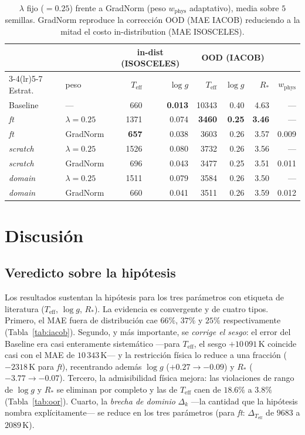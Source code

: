 \documentclass[sigconf,ACM]{acmart}
\begin{document}
\begin{table}[htbp]
  \caption{$\lambda$ fijo ($=0.25$) frente a GradNorm (peso $w_\mathrm{phys}$
  adaptativo), media sobre $5$ semillas. GradNorm reproduce la corrección OOD
  (MAE IACOB) reduciendo a la mitad el costo in-distribution (MAE ISOSCELES).}
  \label{tab:gradnorm}
  \scriptsize
  \setlength{\tabcolsep}{3pt}
  \begin{tabular}{llrrrrrr}
    \toprule
    & & \multicolumn{2}{c}{in-dist (ISOSCELES)} & \multicolumn{3}{c}{OOD (IACOB)} & \\
    \cmidrule(lr){3-4}\cmidrule(lr){5-7}
    Estrat. & peso & $T_\mathrm{eff}$ & $\log g$ & $T_\mathrm{eff}$ & $\log g$ & $R_*$ & $w_\mathrm{phys}$ \\
    \midrule
    Baseline & --- & 660 & \textbf{0.013} & 10343 & 0.40 & 4.63 & --- \\
    \midrule
    \emph{ft}      & $\lambda{=}0.25$ & 1371 & 0.074 & \textbf{3460} & \textbf{0.25} & \textbf{3.46} & --- \\
    \emph{ft}      & GradNorm & \textbf{657} & 0.038 & 3603 & 0.26 & 3.57 & 0.009 \\
    \emph{scratch} & $\lambda{=}0.25$ & 1526 & 0.080 & 3732 & 0.26 & 3.56 & --- \\
    \emph{scratch} & GradNorm & 696 & 0.043 & 3477 & 0.25 & 3.51 & 0.011 \\
    \emph{domain}  & $\lambda{=}0.25$ & 1511 & 0.079 & 3584 & 0.26 & 3.50 & --- \\
    \emph{domain}  & GradNorm & 660 & 0.041 & 3511 & 0.26 & 3.59 & 0.012 \\
    \bottomrule
  \end{tabular}
\end{table}


\section{Discusión}
\label{sec:discusion}

\subsection{Veredicto sobre la hipótesis}

Los resultados sustentan la hipótesis para los tres parámetros con etiqueta de
literatura ($T_\mathrm{eff}$, $\log g$, $R_*$). La evidencia es convergente y de
cuatro tipos. Primero, el MAE fuera de distribución cae $66\%$, $37\%$ y $25\%$
respectivamente (Tabla~\ref{tab:iacob}). Segundo, y más importante, se
\emph{corrige el sesgo}: el error del Baseline era casi enteramente sistemático
---para $T_\mathrm{eff}$, el sesgo $+10\,091$\,K coincide casi con el MAE de
$10\,343$\,K--- y la restricción física lo reduce a una fracción ($-2318$\,K para
\emph{ft}), recentrando además $\log g$ ($+0.27\to-0.09$) y $R_*$
($-3.77\to-0.07$). Tercero, la admisibilidad física mejora: las violaciones de
rango de $\log g$ y $R_*$ se eliminan por completo y las de $T_\mathrm{eff}$ caen
de $18.6\%$ a $3.8\%$ (Tabla~\ref{tab:oor}). Cuarto, la \emph{brecha de dominio}
$\Delta_k$ ---la cantidad que la hipótesis nombra explícitamente--- se reduce en
los tres parámetros (para \emph{ft}: $\Delta_{T_\mathrm{eff}}$ de $9683$ a
$2089$\,K).
\end{document}
